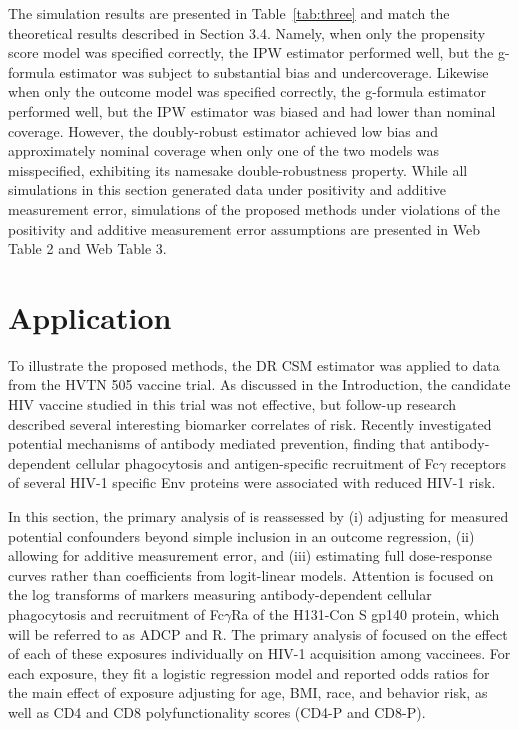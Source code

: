 \documentclass[useAMS,usenatbib,referee]{biom}
\newcommand{\RNum}[1]{\uppercase\expandafter{\romannumeral #1\relax}}
\begin{document}
The simulation results are presented in Table~\ref{tab:three} and match the theoretical results described in Section 3.4. Namely, when only the propensity score model was specified correctly, the IPW estimator performed well, but the g-formula estimator was subject to substantial bias and undercoverage. Likewise when only the outcome model was specified correctly, the g-formula estimator performed well, but the IPW estimator was biased and had lower than nominal coverage. However, the doubly-robust estimator achieved low bias and approximately nominal coverage when only one of the two models was misspecified, exhibiting its namesake double-robustness property. While all simulations in this section generated data under positivity and additive measurement error, simulations of the proposed methods under violations of the positivity and additive measurement error assumptions are presented in Web Table 2 and Web Table 3.

\section{Application}

To illustrate the proposed methods, the DR CSM estimator was applied to data from the HVTN 505 vaccine trial. As discussed in the Introduction, the candidate HIV vaccine studied in this trial was not effective, but follow-up research described several interesting biomarker correlates of risk. Recently \citet{neidich2019} investigated potential mechanisms of antibody mediated prevention, finding that antibody-dependent cellular phagocytosis and antigen-specific recruitment of Fc$\gamma$ receptors of several HIV-1 specific Env proteins were associated with reduced HIV-1 risk.

In this section, the primary analysis of \citet{neidich2019} is reassessed by (i) adjusting for measured potential confounders beyond simple inclusion in an outcome regression, (ii) allowing for additive measurement error, and (iii) estimating full dose-response curves rather than coefficients from logit-linear models. Attention is focused on the log transforms of markers measuring antibody-dependent cellular phagocytosis and recruitment of Fc$\gamma$R\RNum{2}a of the H131-Con S gp140 protein, which will be referred to as ADCP and R\RNum{2}. The primary analysis of \citet{neidich2019} focused on the effect of each of these exposures individually on HIV-1 acquisition among vaccinees. For each exposure, they fit a logistic regression model and reported odds ratios for the main effect of exposure adjusting for age, BMI, race, and behavior risk, as well as CD4 and CD8 polyfunctionality scores (CD4-P and CD8-P).
\end{document}
